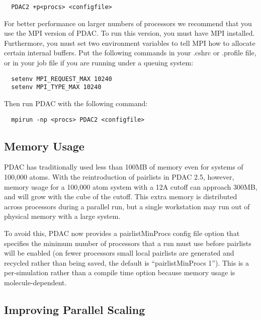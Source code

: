 \begin{verbatim}
  PDAC2 +p<procs> <configfile>
\end{verbatim}

For better performance on larger numbers of processors we recommend
that you use the MPI version of PDAC.  To run this version, you must
have MPI installed.  Furthermore, you must set two environment
variables to tell MPI how to allocate certain internal buffers.  Put
the following commands in your .cshrc or .profile file, or in your
job file if you are running under a queuing system:

\begin{verbatim}
  setenv MPI_REQUEST_MAX 10240
  setenv MPI_TYPE_MAX 10240
\end{verbatim}

Then run PDAC with the following command:

\begin{verbatim}
  mpirun -np <procs> PDAC2 <configfile>
\end{verbatim}

\subsection{Memory Usage}

PDAC has traditionally used less than 100MB of memory even for systems
of 100,000 atoms.  With the reintroduction of pairlists in PDAC 2.5,
however, memory usage for a 100,000 atom system with a 12A cutoff can
approach 300MB, and will grow with the cube of the cutoff.  This extra
memory is distributed across processors during a parallel run, but a
single workstation may run out of physical memory with a large system.

To avoid this, PDAC now provides a pairlistMinProcs config file option
that specifies the minimum number of processors that a run must use
before pairlists will be enabled (on fewer processors small local
pairlists are generated and recycled rather than being saved, the
default is ``pairlistMinProcs 1'').  This is a per-simulation rather than
a compile time option because memory usage is molecule-dependent.

\subsection{Improving Parallel Scaling}

